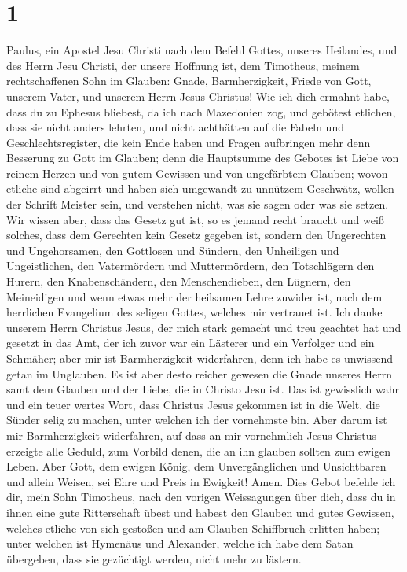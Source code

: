 \hypertarget{section}{%
\section{1}\label{section}}

 Paulus, ein Apostel Jesu Christi nach dem Befehl Gottes,
unseres Heilandes, und des Herrn Jesu Christi, der unsere Hoffnung ist,
 dem Timotheus, meinem rechtschaffenen Sohn im Glauben:
Gnade, Barmherzigkeit, Friede von Gott, unserem Vater, und unserem Herrn
Jesus Christus!  Wie ich dich ermahnt habe, dass du zu
Ephesus bliebest, da ich nach Mazedonien zog, und gebötest etlichen,
dass sie nicht anders lehrten,  und nicht achthätten auf
die Fabeln und Geschlechtsregister, die kein Ende haben und Fragen
aufbringen mehr denn Besserung zu Gott im Glauben;  denn
die Hauptsumme des Gebotes ist Liebe von reinem Herzen und von gutem
Gewissen und von ungefärbtem Glauben;  wovon etliche sind
abgeirrt und haben sich umgewandt zu unnützem Geschwätz, 
wollen der Schrift Meister sein, und verstehen nicht, was sie sagen oder
was sie setzen.  Wir wissen aber, dass das Gesetz gut ist,
so es jemand recht braucht  und weiß solches, dass dem
Gerechten kein Gesetz gegeben ist, sondern den Ungerechten und
Ungehorsamen, den Gottlosen und Sündern, den Unheiligen und
Ungeistlichen, den Vatermördern und Muttermördern, den Totschlägern
 den Hurern, den Knabenschändern, den Menschendieben, den
Lügnern, den Meineidigen und wenn etwas mehr der heilsamen Lehre zuwider
ist,  nach dem herrlichen Evangelium des seligen Gottes,
welches mir vertrauet ist.  Ich danke unserem Herrn
Christus Jesus, der mich stark gemacht und treu geachtet hat und gesetzt
in das Amt,  der ich zuvor war ein Lästerer und ein
Verfolger und ein Schmäher; aber mir ist Barmherzigkeit widerfahren,
denn ich habe es unwissend getan im Unglauben.  Es ist
aber desto reicher gewesen die Gnade unseres Herrn samt dem Glauben und
der Liebe, die in Christo Jesu ist.  Das ist gewisslich
wahr und ein teuer wertes Wort, dass Christus Jesus gekommen ist in die
Welt, die Sünder selig zu machen, unter welchen ich der vornehmste bin.
 Aber darum ist mir Barmherzigkeit widerfahren, auf dass
an mir vornehmlich Jesus Christus erzeigte alle Geduld, zum Vorbild
denen, die an ihn glauben sollten zum ewigen Leben.  Aber
Gott, dem ewigen König, dem Unvergänglichen und Unsichtbaren und allein
Weisen, sei Ehre und Preis in Ewigkeit! Amen.  Dies Gebot
befehle ich dir, mein Sohn Timotheus, nach den vorigen Weissagungen über
dich, dass du in ihnen eine gute Ritterschaft übest  und
habest den Glauben und gutes Gewissen, welches etliche von sich gestoßen
und am Glauben Schiffbruch erlitten haben;  unter welchen
ist Hymenäus und Alexander, welche ich habe dem Satan übergeben, dass
sie gezüchtigt werden, nicht mehr zu lästern.

